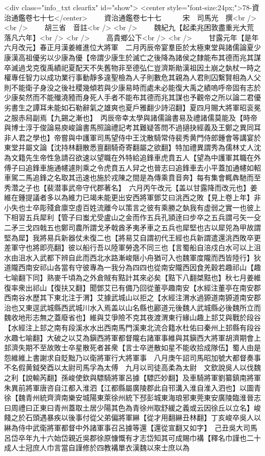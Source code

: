 <div class="info_txt clearfix" id="show">
<center style="font-size:24px;">78-資治通鑑卷七十七</center>
  　　資治通鑑卷七十七　　　宋　司馬光　撰<br />
<br />
　　胡三省　音註<br />
<br />
　　魏紀九【起柔兆困敦盡重光大荒落凡六年】<br />
<br />
　　高貴鄉公下<br />
<br />
　　甘露元年【是年六月改元】春正月漢姜維進位大將軍　二月丙辰帝宴羣臣於太極東堂與諸儒論夏少康漢高祖優劣以少康為優【帝謂少康生於滅亡之後降為諸侯之隸能布其德而兆其謀卒滅過戈克復禹績祀夏配天不失舊物非至德弘仁豈濟斯勛漢祖因土崩之埶杖一時之權專任智力以成功業行事動靜多違聖檢為人子則數危其親為人君則囚繫賢相為人父則不能衛子身没之後社稷幾傾若與少康易時而處未必能復大禹之績嗚呼帝固有志於少康矣然而不能殱澆豷而身死人手者不能布其德而兆其謀也予觀帝之所以論二君優劣書生之譚耳未能如石勒辭氣之雄爽也夏戶雅翻少詩沼翻】夏四月賜大將軍昭衮冕之服赤舄副焉【九錫之漸也】　丙辰帝幸太學與諸儒論書易及禮諸儒莫能及【時帝與博士淳于俊論易庾峻論書馬照論禮記考其難疑答問不過擿抉經義及王鄭之異同耳非人君之學也】帝嘗與中護軍司馬望侍中王沈散騎常侍裴秀黄門侍郎鍾會等講宴於東堂并屬文論【沈持林翻散悉亶翻騎奇寄翻屬之欲翻】特加禮異謂秀為儒林丈人沈為文籍先生帝性急請召欲速以望職在外特給追鋒車虎賁五人【望為中護軍其職在外傅子曰追鋒車施通幰遽則乘之令虎賁五人舁之也晉志曰追鋒車去小平蓋加通幰如軺車駕二馬追鋒之名取其迅速也施於戎陳之間是為傳乘賁音奔】每有集會輒犇馳而至秀濳之子也【裴潜事武帝守代郡著名】　六月丙午改元【盖以甘露降而改元也】姜維在鍾提議者多以為維力已竭未能更出安西將軍鄧艾曰洮西之敗【見上卷上年】非小失也士卒彫殘倉廪空虛百姓流離今以策言之彼有乘勝之埶我有虚弱之實一也彼上下相習五兵犀利【管子曰蚩尤受盧山之金而作五兵孔頴逹曰步卒之五兵謂弓矢一殳二矛三戈四戟五也鄭司農所謂戈矛戟酋矛夷矛車之五兵也犀堅也古以犀兕為甲故謂堅為犀】我將易兵新器仗未復二也【將易艾自謂初代王經也兵新謂遣還洮西敗卒更差軍守也將即亮翻】彼以船行吾以陸軍勞逸不同三也【言蜀船自涪戍白水可以上沮水由沮水入武都下辨自此而西北水路漸峻陿小舟猶可入也魏軍度隴而西皆陸行】狄道隴西南安祁山各當有守彼專為一我分為四四也從南安隴西因食羌穀若趣祁山【趣七喻翻下同】熟麥千頃為之外倉賊有黠計其來必矣【黠下八翻桀黠也】秋七月姜維復率衆出祁山【復扶又翻】聞鄧艾已有備乃回從董亭趣南安【水經注董亭在南安郡西南谷水歷其下東北注于渭】艾據武城山以拒之【水經注渭水過獂道南獂道南安郡治也又東逕武城縣西武城川水入焉盖以山名縣也酈道元後魏人武城縣必後魏所立而魏收地形志無之蓋廢省也】維與艾爭險不克其夜渡渭東行緣山趣上邽艾與戰於段谷【水經注上邽之南有段溪水水出西南馬門溪東北流合籍水杜佑曰秦州上邽縣有段谷水趣七喻翻】大破之以艾為鎭西將軍都督隴右諸軍事維與其鎭西大將軍胡濟期會上邽濟失期不至故敗士卒星散死者甚衆【言士卒迸散如星不能收拾成隊伍】蜀人由是怨維維上書謝求自貶黜乃以衛將軍行大將軍事　八月庚午詔司馬昭加號大都督奏事不名假黄鉞癸酉以太尉司馬孚為太傅　九月以司徒高柔為太尉　文欽說吳人以伐魏之利【說輸芮翻】孫峻使欽與驃騎將軍呂據【驃匹妙翻】及車騎將軍劉纂鎮南將軍朱異前將軍唐咨自江都入淮泗【江都縣屬廣陵郡此自邗溝入淮自淮入泗也】以圖青徐【魏青州統齊濟南樂安城陽東萊徐州統下邳彭城東海琅邪東莞東安廣陵臨淮晉志曰周禮曰正東曰青州蓋取土居少陽其色為青徐州取舒緩之義或云因徐丘以立名】峻餞之於石頭遇暴疾以後事付從父弟偏將軍綝【從才用翻綝丑林翻】丁亥峻卒吳人以綝為侍中武衛將軍都督中外諸軍事召呂據等還【還從宣翻又如字】　己丑吳大司馬呂岱卒年九十六始岱親近吳郡徐原慷慨有才志岱知其可成賜巾褠【釋名巾謹也二十成人士冠庶人巾言當自謹修於四教褠單衣漢魏以來士庶以為